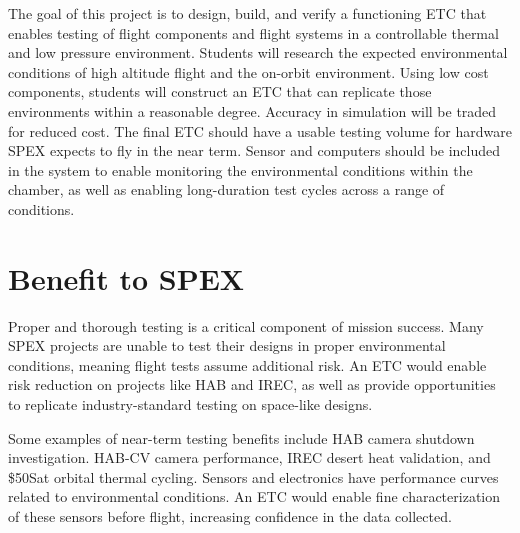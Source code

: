 \documentclass[conference]{IEEEtran} %
\begin{document}
  The goal of this project is to design, build, and verify a functioning ETC that enables testing of flight components and flight systems in a controllable thermal and low pressure environment.
  Students will research the expected environmental conditions of high altitude flight and the on-orbit environment.
  Using low cost components, students will construct an ETC that can replicate those environments within a reasonable degree.
  Accuracy in simulation will be traded for reduced cost.
  The final ETC should have a usable testing volume for hardware SPEX expects to fly in the near term.
  Sensor and computers should be included in the system to enable monitoring the environmental conditions within the chamber, as well as enabling long-duration test cycles across a range of conditions.


\section{Benefit to SPEX}
\label{sec:benefit}

Proper and thorough testing is a critical component of mission success. Many SPEX projects are unable to test their designs in proper environmental conditions, meaning flight tests assume additional risk. An ETC would enable risk reduction on projects like HAB and IREC, as well as provide opportunities to replicate industry-standard testing on space-like designs.\@

Some examples of near-term testing benefits include HAB camera shutdown investigation. HAB-CV camera performance, IREC desert heat validation, and \$50Sat orbital thermal cycling. Sensors and electronics have performance curves related to environmental conditions. An ETC would enable fine characterization of these sensors before flight, increasing confidence in the data collected.\@
\end{document}
